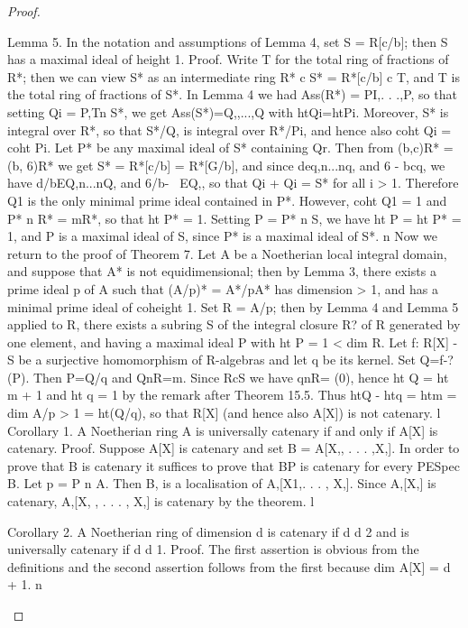 \begin{proof}
\begin{mathematicalrecord}
{{Lemma 5. In the notation      and assumptions of Lemma 4, set S = R[c/b];
then S has a maximal ideal of height 1.
Proof. Write T for the total ring of fractions of R*; then we can view S*
as an intermediate ring R* c S* = R*[c/b] c T, and T is the total ring of
fractions of S*. In Lemma 4 we had Ass(R*) = {PI,. . .,P}, so that
setting Qi = P,Tn S*, we get
          Ass(S*)={Q,,...,Q}      with htQi=htPi.
Moreover, S* is integral over R*, so that S*/Q, is integral over R*/Pi,
and hence also coht Qi = coht Pi. Let P* be any maximal ideal of S*
containing Qr. Then from (b,c)R* = (b, 6)R* we get S* = R*[c/b] =
R*[G/b], and since deq,n...nq,      and 6 - bcq, we have
          d/bEQ,n...nQ,       and 6/b- ~EQ,,
so that Qi + Qi = S* for all i > 1. Therefore Q1 is the only minimal prime
ideal contained in P*. However, coht Q1 = 1 and P* n R* = mR*, so that
ht P* = 1. Setting P = P* n S, we have ht P = ht P* = 1, and P is a maximal
ideal of S, since P* is a maximal ideal of S*. n
   Now we return to the proof of Theorem 7. Let A be a Noetherian local
integral domain,     and suppose that A* is not equidimensional;
then by Lemma 3, there exists a prime ideal p of A such that (A/p)* =
A*/pA* has dimension > 1, and has a minimal prime ideal of coheight
1. Set R = A/p; then by Lemma 4 and Lemma 5 applied to R, there exists
a subring S of the integral closure R? of R generated by one element, and
having a maximal ideal P with ht P = 1 < dim R. Let f: R[X] -S          be a
surjective homomorphism       of R-algebras and let q be its kernel. Set
Q=f-?(P).     Then P=Q/q and QnR=m.           Since RcS we have qnR=
(0), hence ht Q = ht m + 1 and ht q = 1 by the remark after Theorem 15.5.
Thus htQ - htq = htm = dim A/p > 1 = ht(Q/q), so that R[X] (and hence
also A[X]) is not catenary. l
Corollary 1. A Noetherian ring A is universally catenary if and only if
A[X]   is catenary.
Proof. Suppose A[X] is catenary and set B = A[X,, . . . ,X,]. In order to
prove that B is catenary it suffices to prove that BP is catenary for every
PESpec B. Let p = P n A. Then B, is a localisation of A,[X1,. . . , X,]. Since
A,[X,]    is catenary, A,[X, , . . . , X,] is catenary by the theorem.  l

Corollary 2. A Noetherian ring of dimension d is catenary if d d 2 and is
universally catenary if d d 1.
Proof. The first assertion is obvious from the definitions and the second
assertion follows from the first because dim A[X] = d + 1. n


}}
\end{mathematicalrecord}
\end{proof}
